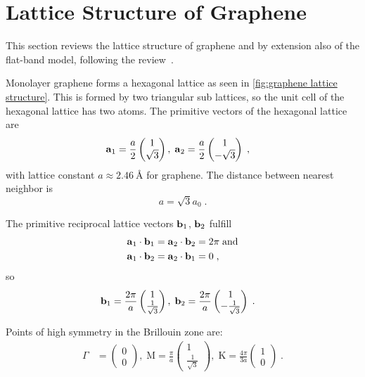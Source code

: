 \documentclass[../main.tex]{subfiles}
\begin{document}
\section{Lattice Structure of Graphene}\label{sec:lattice-structure-of-graphene}

This section reviews the lattice structure of graphene and by extension also of the flat-band model, following the review~\cite{yangStructureGrapheneIts2018}.

Monolayer graphene forms a hexagonal lattice as seen in \cref{fig:graphene lattice structure}.
This is formed by two triangular sub lattices, so the unit cell of the hexagonal lattice has two atoms.
The primitive vectors of the hexagonal lattice are
\begin{align}
	\bm{\mathrm{a}}_1 &= \frac{a}{2} \begin{pmatrix} 1 \\ \sqrt{3} \end{pmatrix} ,\;
	\bm{\mathrm{a}}_2 = \frac{a}{2} \begin{pmatrix} 1 \\ -\sqrt{3} \end{pmatrix}
	\;,
\end{align}
with lattice constant \(a \approx \qty{2.46}{\angstrom}\) for graphene.
The distance between nearest neighbor is
\begin{equation}
	a = \sqrt{3} a_0 \;.
\end{equation}

The primitive reciprocal lattice vectors \(\bm{\mathrm{b}}_1\), \(\bm{\mathrm{b}}_2\) fulfill
\begin{align}
	\bm{\mathrm{a}}_1 \cdot \bm{\mathrm{b}}_1 &= \bm{\mathrm{a}}_2 \cdot \bm{\mathrm{b}}_2 = 2\pi \; \text{and} \notag\\
	\bm{\mathrm{a}}_1 \cdot \bm{\mathrm{b}}_2 &= \bm{\mathrm{a}}_2 \cdot \bm{\mathrm{b}}_1 = 0
	\;,
\end{align}
so
\begin{align}
	\bm{\mathrm{b}}_1 &= \frac{2\pi}{a} \begin{pmatrix} 1 \\ \frac{1}{\sqrt{3}} \end{pmatrix} ,\;
	\bm{\mathrm{b}}_2 = \frac{2\pi}{a} \begin{pmatrix} 1 \\ - \frac{1}{\sqrt{3}} \end{pmatrix}
	\;.
\end{align}

Points of high symmetry in the Brillouin zone are:
\begin{align}
	\Gamma &= \begin{pmatrix} 0 \\ 0 \end{pmatrix} ,\;
	\mathrm{M} = \frac{\pi}{a} \begin{pmatrix} 1 \\ \frac{1}{\sqrt{3}} \end{pmatrix} ,\;
	\mathrm{K} = \frac{4\pi}{3 a} \begin{pmatrix} 1 \\ 0 \end{pmatrix} \;.
\end{align}
\end{document}
